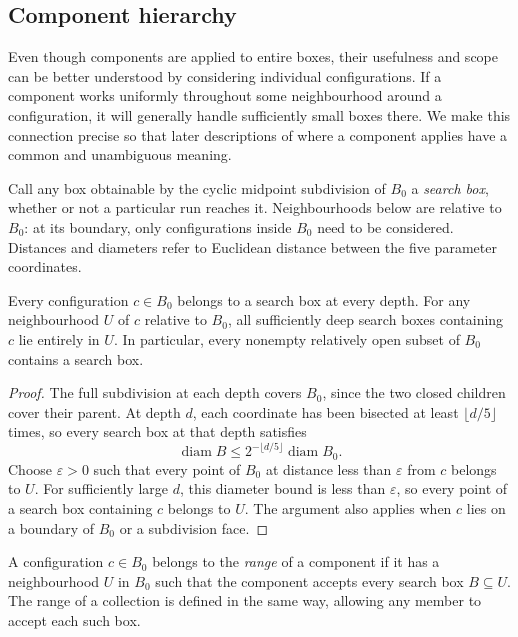 \subsection{Component hierarchy}\label{subsec:component-hierarchy}

Even though components are applied to entire boxes, their usefulness and
scope can be better understood by considering individual configurations.
If a component works uniformly throughout some neighbourhood
around a configuration, it will generally handle sufficiently small boxes
there. We make this connection precise so that later descriptions of where
a component applies have a common and unambiguous meaning.

Call any box obtainable by the cyclic midpoint subdivision of $B_0$ a
\emph{search box}, whether or not a particular run reaches it. Neighbourhoods
below are relative to $B_0$: at its boundary, only configurations inside
$B_0$ need to be considered. Distances and diameters refer to Euclidean
distance between the five parameter coordinates.

\begin{lemma}\label{lem:search-boxes-in-neighbourhoods}
  Every configuration $c\in B_0$ belongs to a search box at every depth.
  For any neighbourhood $U$ of $c$ relative to $B_0$, all sufficiently deep
  search boxes containing $c$ lie entirely in $U$. In particular, every
  nonempty relatively open subset of $B_0$ contains a search box.
\end{lemma}
\begin{proof}
  The full subdivision at each depth covers $B_0$, since the two closed
  children cover their parent. At depth $d$, each coordinate has been
  bisected at least $\lfloor d/5\rfloor$ times, so every search box at that
  depth satisfies
  \begin{equation}\label{eq:search-box-diameter-bound}
    \operatorname{diam}B
      \le 2^{-\lfloor d/5\rfloor}\operatorname{diam}B_0.
  \end{equation}
  Choose $\varepsilon>0$ such that every point of $B_0$ at distance less
  than $\varepsilon$ from $c$ belongs to $U$. For sufficiently large $d$,
  this diameter bound is less than $\varepsilon$, so every point of a
  search box containing $c$ belongs to $U$. The argument also applies
  when $c$ lies on a boundary of $B_0$ or a subdivision face.
\end{proof}

\begin{definition}\label{def:range-of-a-component}
  A configuration $c\in B_0$ belongs to the \emph{range} of a component if
  it has a neighbourhood $U$ in $B_0$ such that the component accepts every
  search box $B\subseteq U$. The range of a collection is
  defined in the same way, allowing any member to accept
  each such box.
\end{definition}

